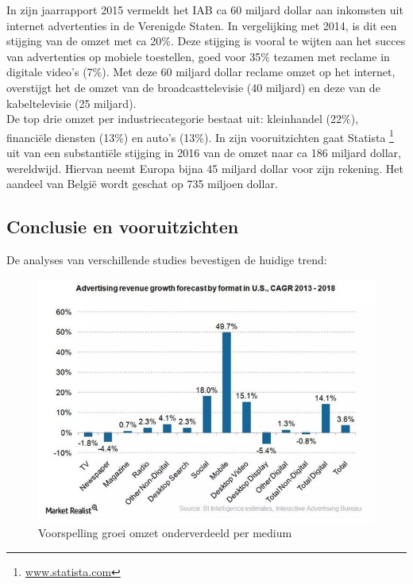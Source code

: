 \documentclass[pdftex,a4paper,12pt,twoside]{report}
\begin{document}
In zijn jaarrapport 2015 vermeldt het IAB ca 60 miljard dollar aan inkomsten uit internet advertenties in de Verenigde Staten. In vergelijking met 2014, is dit een stijging van de omzet met ca 20\%. Deze stijging is vooral te wijten aan het succes van advertenties op mobiele toestellen, goed voor 35\% tezamen met reclame in digitale video’s (7\%). 
Met deze 60 miljard dollar reclame omzet op het internet, overstijgt het de omzet van de broadcasttelevisie (40 miljard) en deze van de kabeltelevisie (25 miljard).
\\
De top drie omzet per industriecategorie bestaat uit: kleinhandel (22\%), financiële diensten (13\%) en auto’s (13\%). 
In zijn vooruitzichten gaat Statista \footnote{\url{www.statista.com}} uit van een substantiële stijging in 2016 van de omzet naar ca 186 miljard dollar, wereldwijd. Hiervan neemt Europa bijna 45 miljard dollar voor zijn rekening. Het aandeel van België wordt geschat op 735 miljoen dollar.

\subsection{Conclusie en vooruitzichten }
\label{Conclusie en vooruitzichten }
De analyses van verschillende studies \citep{Silverman2015,BI-Insider2016, EMarketer2016, pwc2015} bevestigen de huidige trend:

\begin{figure}[h!]
\centering
\includegraphics[width=12cm]{img/advRevGrowthFormat}
\caption{Voorspelling groei omzet onderverdeeld per medium}
\label{fig: Advertising revenue growth forecast by format}
\end{figure} 
\end{document}
